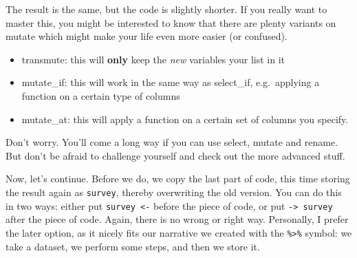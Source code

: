 \documentclass[]{tufte-book}
\newenvironment{Shaded}{}{}
\newcommand{\DataTypeTok}[1]{\textcolor[rgb]{0.56,0.13,0.00}{#1}}
\newcommand{\KeywordTok}[1]{\textcolor[rgb]{0.00,0.44,0.13}{\textbf{#1}}}
\newcommand{\NormalTok}[1]{#1}
\newcommand{\OperatorTok}[1]{\textcolor[rgb]{0.40,0.40,0.40}{#1}}
\newcommand{\StringTok}[1]{\textcolor[rgb]{0.25,0.44,0.63}{#1}}
\providecommand{\tightlist}{%
  \setlength{\itemsep}{0pt}\setlength{\parskip}{0pt}}
\begin{document}
The result is the same, but the code is slightly shorter. If you really want to master this, you might be interested to know that there are plenty variants on mutate which might make your life even more easier (or confused).

\begin{itemize}
\tightlist
\item
  transmute: this will \textbf{only} keep the \emph{new} variables your list in it
\item
  mutate\_if: this will work in the same way as select\_if, e.g.~applying a function on a certain type of columns
\item
  mutate\_at: this will apply a function on a certain set of columns you specify.
\end{itemize}

Don't worry. You'll come a long way if you can use select, mutate and rename. But don't be afraid to challenge yourself and check out the more advanced stuff.

Now, let's continue. Before we do, we copy the last part of code, this time storing the result again as \texttt{survey}, thereby overwriting the old version. You can do this in two ways: either put \texttt{survey\ \textless{}-} before the piece of code, or put \texttt{-\textgreater{}\ survey} after the piece of code. Again, there is no wrong or right way. Personally, I prefer the later option, as it nicely fits our narrative we created with the \texttt{\%\textgreater{}\%} symbol: we take a dataset, we perform some steps, and then we store it.

\begin{Shaded}
\end{Shaded}
\end{document}
